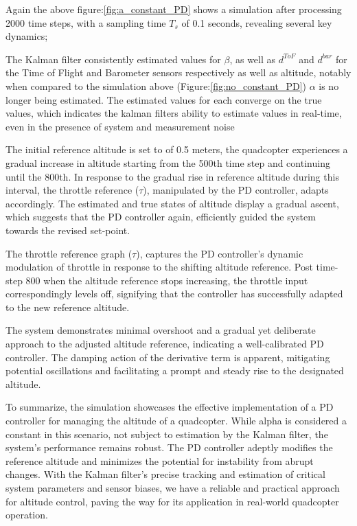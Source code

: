 \documentclass{article}
\begin{document}
Again the above figure:\ref{fig:a_constant_PD} shows a simulation after processing 2000 time steps, with a sampling time \(T_s\) of 0.1 seconds, revealing several key dynamics;

The Kalman filter consistently estimated values for \( \beta \), as well as \( d^{ToF} \) and \( d^{bar} \) for the Time of Flight and Barometer sensors respectively as well as altitude,
notably when compared to the simulation above (Figure:\ref{fig:no_constant_PD}) \(\alpha\) is no longer being estimated. The estimated values for each converge on the true values, which indicates the kalman filters ability to estimate values in real-time, even in the presence of system and measurement noise

The initial reference altitude is set to of 0.5 meters, the quadcopter experiences a gradual increase in altitude starting from the 500th time step and continuing until the 800th. In response to the gradual rise in reference altitude during this interval, the throttle reference (\( \tau \)), manipulated by the PD controller, adapts accordingly. 
The estimated and true states of altitude display a gradual ascent, which suggests that the PD controller again, efficiently guided the system towards the revised set-point.

The throttle reference graph (\( \tau \)), captures the PD controller's dynamic modulation of throttle in response to the shifting altitude reference. Post time-step 800 when the altitude reference stops increasing, the throttle input correspondingly levels off, signifying that the controller has successfully adapted to the new reference altitude.

The system demonstrates minimal overshoot and a gradual yet deliberate approach to the adjusted altitude reference, indicating a well-calibrated PD controller. The damping action of the derivative term is apparent, mitigating potential oscillations and facilitating a prompt and steady rise to the designated altitude.

To summarize, the simulation showcases the effective implementation of a PD controller for managing the altitude of a quadcopter. While alpha is considered a constant in this scenario, not subject to estimation by the Kalman filter, the system's performance remains robust. The PD controller adeptly modifies the reference altitude and minimizes 
the potential for instability from abrupt changes. With the Kalman filter's precise tracking and estimation of critical system parameters and sensor biases, we have a reliable and practical approach for altitude control, paving the way for its application in real-world quadcopter operation.
\end{document}

